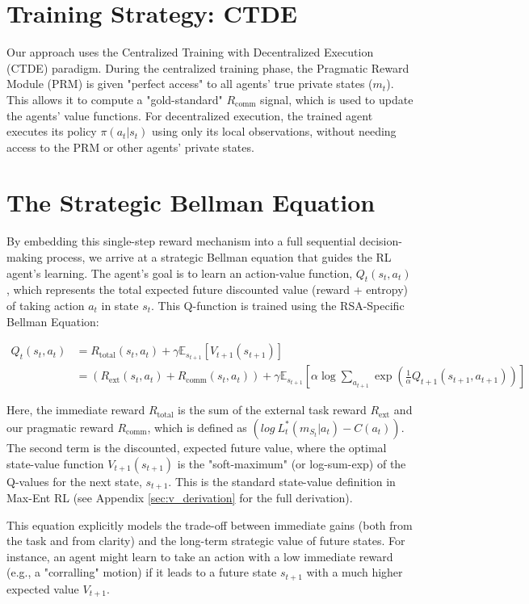 \documentclass[12pt, a4paper]{report}
\newcommand{\Rcomm}{R_{\text{comm}}}
\newcommand{\Rext}{R_{\text{ext}}}
\newcommand{\Rtotal}{R_{\text{total}}}
\begin{document}
\section{Training Strategy: CTDE}
Our approach uses the Centralized Training with Decentralized Execution (CTDE) paradigm. During the centralized training phase, the Pragmatic Reward Module (PRM) is given "perfect access" to all agents' true private states ($m_t$). This allows it to compute a "gold-standard" $\Rcomm$ signal, which is used to update the agents' value functions. For decentralized execution, the trained agent executes its policy $\pi(a_t | s_t)$ using only its local observations, without needing access to the PRM or other agents' private states.

\section{The Strategic Bellman Equation}
By embedding this single-step reward mechanism into a full sequential decision-making process, we arrive at a strategic Bellman equation that guides the RL agent's learning. The agent's goal is to learn an action-value function, $Q_t(s_t, a_t)$, which represents the total expected future discounted value (reward + entropy) of taking action $a_t$ in state $s_t$. This Q-function is trained using the RSA-Specific Bellman Equation:

\begin{align*}
Q_{t}(s_{t},a_{t}) &= \Rtotal(s_{t},a_{t}) + \gamma\mathbb{E}_{s_{t+1}}\left[V_{t+1}(s_{t+1})\right] \\
&= (\Rext(s_{t},a_{t}) + \Rcomm(s_{t},a_{t})) + \gamma\mathbb{E}_{s_{t+1}}\left[\alpha \log\sum_{a_{t+1}}\exp\left(\frac{1}{\alpha}Q_{t+1}(s_{t+1},a_{t+1})\right)\right] \label{eq:bellman}
\end{align*}


Here, the immediate reward $\Rtotal$ is the sum of the external task reward $\Rext$ and our pragmatic reward $\Rcomm$, which is defined as $(log~L_{t}^{*}(m_{S_{t}}|a_{t})-C(a_{t}))$. The second term is the discounted, expected future value, where the optimal state-value function $V_{t+1}(s_{t+1})$ is the "soft-maximum" (or log-sum-exp) of the Q-values for the next state, $s_{t+1}$. This is the standard state-value definition in Max-Ent RL (see Appendix \ref{sec:v_derivation} for the full derivation).

This equation explicitly models the trade-off between immediate gains (both from the task and from clarity) and the long-term strategic value of future states. For instance, an agent might learn to take an action with a low immediate reward (e.g., a "corralling" motion) if it leads to a future state $s_{t+1}$ with a much higher expected value $V_{t+1}$.
\end{document}
